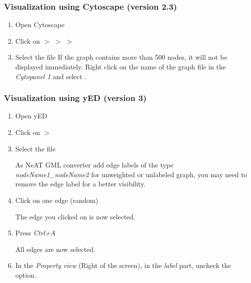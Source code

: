 \subsubsection{Visualization using Cytoscape (version 2.3)}
\begin{enumerate}
 \item Open Cytoscape
 \item Click on  $>$   $>$  $>$  
 \item Select the file 
If the graph contains more than 500 nodes, it will not be displayed immediately. Right click on the name of the graph file in the \textit{Cytopanel 1} and select .
\end{enumerate}

\subsubsection{Visualization using yED (version 3)}
\begin{enumerate}
 \item Open yED
 \item Click on  $>$ 
 \item Select the file 

As NeAT GML converter add edge labels of the type \textit{nodeName1\_nodeName2} for unweighted or unlabeled graph, you may need to remove the edge label for a better visibility.
 \item Click on one edge (random)
 
 The edge you clicked on is now selected.
 \item Press \textit{Ctrl+A}

All edges are now selected. 
 \item In the \textit{Property view} (Right of the screen), in the \textit{label} part, uncheck the  option.

\end{enumerate}





